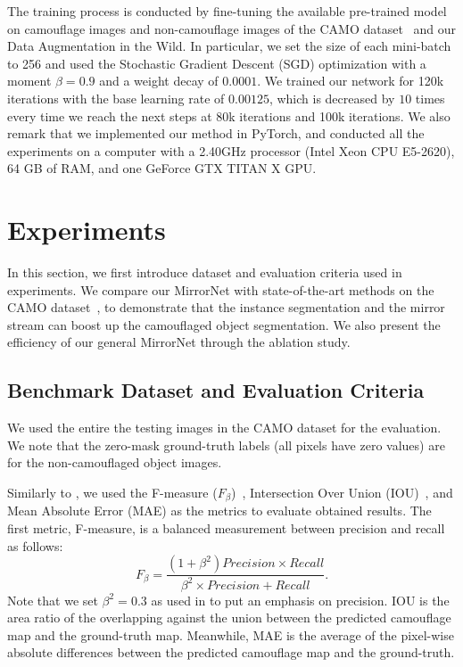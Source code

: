 \documentclass[journal]{IEEEtran}
\begin{document}
The training process is conducted by fine-tuning the available pre-trained model on camouflage images and non-camouflage images of the CAMO dataset~\cite{CAMO} and our Data Augmentation in the Wild. In particular, we set the size of each mini-batch to 256 and used the Stochastic Gradient Descent (SGD) optimization with a moment $\beta=0.9$ and a weight decay of $0.0001$. We trained our network for 120k iterations with the base learning rate of $0.00125$, which is decreased by $10$ times every time we reach the next steps at 80k iterations and 100k iterations. We also remark that we implemented our method in PyTorch, and conducted all the experiments on a computer with a 2.40GHz processor (Intel Xeon CPU E5-2620), 64 GB of RAM, and one GeForce GTX TITAN X GPU. 




\section{Experiments}
\label{sec:results}
In this section, we first introduce dataset and evaluation criteria used in experiments.  We compare our MirrorNet with state-of-the-art methods on the CAMO dataset~\cite{CAMO}, to demonstrate that the instance segmentation and the mirror stream can boost up the camouflaged object segmentation. We also present the efficiency of our general MirrorNet through the ablation study.

\subsection{Benchmark Dataset and Evaluation Criteria}




We used the entire the testing images in the CAMO dataset for the evaluation. We note that the zero-mask ground-truth labels (all pixels have zero values) are for the non-camouflaged object images. 

Similarly to \cite{CAMO}, we used the F-measure ($F_\beta$)~\cite{Achanta-CVPR2009}, Intersection Over Union (IOU)~\cite{Long-ICCV2015}, and Mean Absolute Error (MAE) as the metrics to evaluate obtained results. The first metric, F-measure, is a balanced measurement between precision and recall as follows: 
\begin{equation}
{F_\beta } = \frac{{\left( {1 + {\beta ^2}} \right)Precision \times Recall}}{{{\beta ^2} \times Precision + Recall}}.
\end{equation}
Note that we set $\beta^2=0.3$ as used in \cite{Achanta-CVPR2009,AH} to put an emphasis on precision. 
IOU is the area ratio of the overlapping against the union between the predicted camouflage map and the ground-truth map. Meanwhile, MAE is the average of the pixel-wise absolute differences between the predicted camouflage map and the ground-truth.
\end{document}
